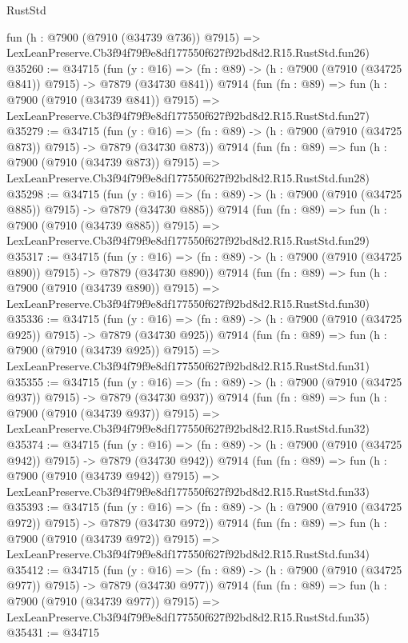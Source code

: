 \begin{lexlean}{RustStd}
\begin{coremodule}
    fun (h : @7900 (@7910 (@34739 @736)) @7915) =>
    LexLeanPreserve.Cb3f94f79f9e8df177550f627f92bd8d2.R15.RustStd.fun26)
@35260 := @34715
    (fun (y : @16) => (fn : @89) -> (h : @7900 (@7910 (@34725 @841)) @7915) -> @7879 (@34730 @841))
    @7914
    (fun (fn : @89) =>
    fun (h : @7900 (@7910 (@34739 @841)) @7915) =>
    LexLeanPreserve.Cb3f94f79f9e8df177550f627f92bd8d2.R15.RustStd.fun27)
@35279 := @34715
    (fun (y : @16) => (fn : @89) -> (h : @7900 (@7910 (@34725 @873)) @7915) -> @7879 (@34730 @873))
    @7914
    (fun (fn : @89) =>
    fun (h : @7900 (@7910 (@34739 @873)) @7915) =>
    LexLeanPreserve.Cb3f94f79f9e8df177550f627f92bd8d2.R15.RustStd.fun28)
@35298 := @34715
    (fun (y : @16) => (fn : @89) -> (h : @7900 (@7910 (@34725 @885)) @7915) -> @7879 (@34730 @885))
    @7914
    (fun (fn : @89) =>
    fun (h : @7900 (@7910 (@34739 @885)) @7915) =>
    LexLeanPreserve.Cb3f94f79f9e8df177550f627f92bd8d2.R15.RustStd.fun29)
@35317 := @34715
    (fun (y : @16) => (fn : @89) -> (h : @7900 (@7910 (@34725 @890)) @7915) -> @7879 (@34730 @890))
    @7914
    (fun (fn : @89) =>
    fun (h : @7900 (@7910 (@34739 @890)) @7915) =>
    LexLeanPreserve.Cb3f94f79f9e8df177550f627f92bd8d2.R15.RustStd.fun30)
@35336 := @34715
    (fun (y : @16) => (fn : @89) -> (h : @7900 (@7910 (@34725 @925)) @7915) -> @7879 (@34730 @925))
    @7914
    (fun (fn : @89) =>
    fun (h : @7900 (@7910 (@34739 @925)) @7915) =>
    LexLeanPreserve.Cb3f94f79f9e8df177550f627f92bd8d2.R15.RustStd.fun31)
@35355 := @34715
    (fun (y : @16) => (fn : @89) -> (h : @7900 (@7910 (@34725 @937)) @7915) -> @7879 (@34730 @937))
    @7914
    (fun (fn : @89) =>
    fun (h : @7900 (@7910 (@34739 @937)) @7915) =>
    LexLeanPreserve.Cb3f94f79f9e8df177550f627f92bd8d2.R15.RustStd.fun32)
@35374 := @34715
    (fun (y : @16) => (fn : @89) -> (h : @7900 (@7910 (@34725 @942)) @7915) -> @7879 (@34730 @942))
    @7914
    (fun (fn : @89) =>
    fun (h : @7900 (@7910 (@34739 @942)) @7915) =>
    LexLeanPreserve.Cb3f94f79f9e8df177550f627f92bd8d2.R15.RustStd.fun33)
@35393 := @34715
    (fun (y : @16) => (fn : @89) -> (h : @7900 (@7910 (@34725 @972)) @7915) -> @7879 (@34730 @972))
    @7914
    (fun (fn : @89) =>
    fun (h : @7900 (@7910 (@34739 @972)) @7915) =>
    LexLeanPreserve.Cb3f94f79f9e8df177550f627f92bd8d2.R15.RustStd.fun34)
@35412 := @34715
    (fun (y : @16) => (fn : @89) -> (h : @7900 (@7910 (@34725 @977)) @7915) -> @7879 (@34730 @977))
    @7914
    (fun (fn : @89) =>
    fun (h : @7900 (@7910 (@34739 @977)) @7915) =>
    LexLeanPreserve.Cb3f94f79f9e8df177550f627f92bd8d2.R15.RustStd.fun35)
@35431 := @34715

\end{coremodule}
\end{lexlean}
